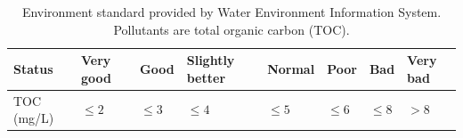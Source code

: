 \documentclass[11pt,titlepage]{article}
\begin{document}

\begin{table}[]
	\centering
	\begin{tabular}{|l|l|l|l|l|l|l|l|}
		\hline
		Status     & Very good & Good     & Slightly better & Normal   & Poor     & Bad      & Very bad \\ \hline
		TOC (mg/L) & $\leq 2$  & $\leq 3$ & $\leq 4$        & $\leq 5$ & $\leq 6$ & $\leq 8$ & $>8$     \\ \hline
	\end{tabular}
	\caption{Environment standard provided by Water Environment Information System. Pollutants are total organic carbon (TOC).}
	\label{table:table1}
\end{table}


\end{document}
